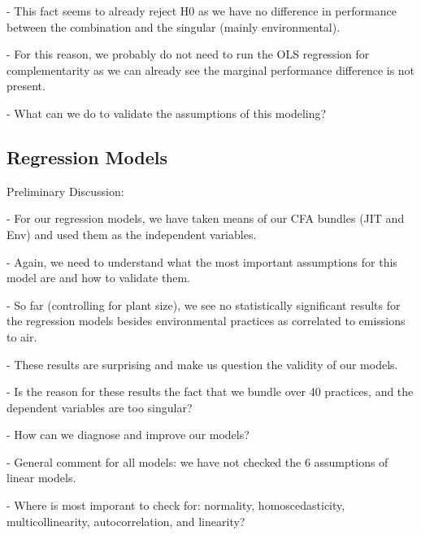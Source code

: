 - This fact seems to already reject H0 as we have no difference in performance between the combination and the singular (mainly environmental).

- For this reason, we probably do not need to run the OLS regression for complementarity as we can already see the marginal performance difference is not present.

- What can we do to validate the assumptions of this modeling?


\subsection*{Regression Models}
Preliminary Discussion:

- For our regression models, we have taken means of our CFA bundles (JIT and Env) and used them as the independent variables.

- Again, we need to understand what the most important assumptions for this model are and how to validate them.

- So far (controlling for plant size), we see no statistically significant results for the regression models besides environmental practices as correlated to emissions to air.

- These results are surprising and make us question the validity of our models.

- Is the reason for these results the fact that we bundle over 40 practices, and the dependent variables are too singular?

- How can we diagnose and improve our models?

- General comment for all models: we have not checked the 6 assumptions of linear models.

- Where is most imporant to check for: normality, homoscedasticity, multicollinearity, autocorrelation, and linearity?


